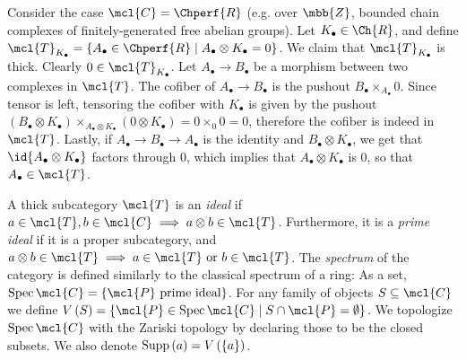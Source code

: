\begin{example*}
	Consider the case $\mcl{C} = \Chperf{R}$ (e.g. over $\mbb{Z}$, bounded chain complexes of finitely-generated free abelian groups).
	Let $K_\bullet \in \Ch{R}$, and define
	$\mcl{T}_{K_\bullet} = \left\{ A_\bullet \in \Chperf{R} \mid A_\bullet \otimes K_\bullet = 0 \right\}$.
	We claim that $\mcl{T}_{K_\bullet}$ is thick.
	Clearly $0 \in \mcl{T}_{K_\bullet}$.
	Let $A_\bullet \to B_\bullet$ be a morphism between two complexes in $\mcl{T}$. The cofiber of $A_\bullet \to B_\bullet$ is the pushout $B_\bullet \times_{A_\bullet} 0$. Since tensor is left, tensoring the cofiber with $K_\bullet$ is given by the pushout
	$\left(B_\bullet \otimes K_\bullet\right) \times_{A_\bullet \otimes K_\bullet} \left(0 \otimes K_\bullet\right) = 0 \times_0 0 = 0$, therefore the cofiber is indeed in $\mcl{T}$.
	Lastly, if $A_\bullet \to B_\bullet \to A_\bullet$ is the identity and $B_\bullet \otimes K_\bullet$, we get that $\id{A_\bullet \otimes K_\bullet}$ factors through $0$, which implies that $A_\bullet \otimes K_\bullet$ is $0$, so that $A_\bullet \in \mcl{T}$.
\end{example*}

\begin{definition}
	A thick subcategory $\mcl{T}$ is an \emph{ideal} if $a \in \mcl{T}, b \in \mcl{C} \implies a \otimes b \in \mcl{T}$.
	Furthermore, it is a \emph{prime ideal} if it is a proper subcategory, and $a \otimes b \in \mcl{T} \implies a \in \mcl{T} \textrm{ or } b \in \mcl{T}$.
	The \emph{spectrum} of the category is defined similarly to the classical spectrum of a ring:
	As a set, $\spec{\mcl{C}} = \left\{ \mcl{P}\textrm{ prime ideal} \right\}$.
	For any family of objects $S \subseteq \mcl{C}$ we define $V\left(S\right) = \left\{ \mcl{P} \in \spec{\mcl{C}} \mid S \cap \mcl{P} = \emptyset \right\}$.
	We topologize $\spec{\mcl{C}}$ with the Zariski topology by declaring those to be the closed subsets.
	We also denote $\operatorname{Supp}\left(a\right) = V\left(\left\{ a\right\}\right)$.
\end{definition}

